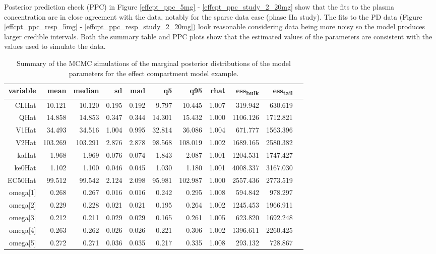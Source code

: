 \documentclass[12pt, reqno, oneside]{amsbook}
\numberwithin{equation}{chapter}
\numberwithin{figure}{chapter}
\numberwithin{table}{chapter}
\theoremstyle{remark}
\begin{document}
Posterior prediction check (PPC) in Figure
\ref{effcpt_ppc_5mg} - \ref{effcpt_ppc_study_2_20mg} show that the fits to the plasma concentration
are in close agreement with the data, notably for the sparse data case (phase IIa study). The fits
to the PD data (Figure \ref{effcpt_ppc_resp_5mg} - \ref{effcpt_ppc_resp_study_2_20mg}) look
reasonable considering data being more noisy so the model
produces larger credible intervals. Both the summary table and PPC
plots show that the estimated values of the
parameters are consistent with the values used to simulate the data.

\begin{table}[htbp]
\caption{\label{effCptModelParms}Summary of the MCMC simulations of the marginal posterior distributions of the model parameters for the effect compartment model example.}
\centering
\footnotesize
\begin{tabular}{r r r r r r r r r r r}
variable & mean & median & sd & mad & q5 & q95 & rhat & ess\textsubscript{bulk} & ess\textsubscript{tail}\\
\hline
CLHat & 10.121 & 10.120 & 0.195 & 0.192 & 9.797 & 10.445 & 1.007 & 319.942 & 630.619\\
QHat & 14.858 & 14.853 & 0.347 & 0.344 & 14.301 & 15.432 & 1.000 & 1106.126 & 1712.821\\
V1Hat & 34.493 & 34.516 & 1.004 & 0.995 & 32.814 & 36.086 & 1.004 & 671.777 & 1563.396\\
V2Hat & 103.269 & 103.291 & 2.876 & 2.878 & 98.568 & 108.019 & 1.002 & 1689.165 & 2580.382\\
kaHat & 1.968 & 1.969 & 0.076 & 0.074 & 1.843 & 2.087 & 1.001 & 1204.531 & 1747.427\\
ke0Hat & 1.102 & 1.100 & 0.046 & 0.045 & 1.030 & 1.180 & 1.001 & 4008.337 & 3167.030\\
EC50Hat & 99.512 & 99.542 & 2.124 & 2.098 & 95.981 & 102.987 & 1.000 & 2557.436 & 2773.519\\
omega[1] & 0.268 & 0.267 & 0.016 & 0.016 & 0.242 & 0.295 & 1.008 & 594.842 & 978.297\\
omega[2] & 0.229 & 0.228 & 0.021 & 0.021 & 0.195 & 0.264 & 1.002 & 1245.453 & 1966.911\\
omega[3] & 0.212 & 0.211 & 0.029 & 0.029 & 0.165 & 0.261 & 1.005 & 623.820 & 1692.248\\
omega[4] & 0.263 & 0.262 & 0.026 & 0.026 & 0.221 & 0.306 & 1.002 & 1396.611 & 2260.425\\
omega[5] & 0.272 & 0.271 & 0.036 & 0.035 & 0.217 & 0.335 & 1.008 & 293.132 & 728.867\\

\end{tabular}
\end{table}
\end{document}
